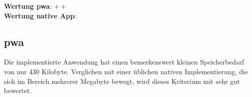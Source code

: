 \textbf{Wertung \ac{pwa}}: $++$ \\
\textbf{Wertung native App}:  \\

\subsection{\ac{pwa}}
Die implementierte Anwendung hat einen bemerkenswert kleinen Speicherbedarf von  nur 430 Kilobyte. Verglichen mit einer üblichen nativen Implementierung, die sich im Bereich mehrerer Megabyte bewegt, wird dieses Kriterium mit sehr gut bewertet.
